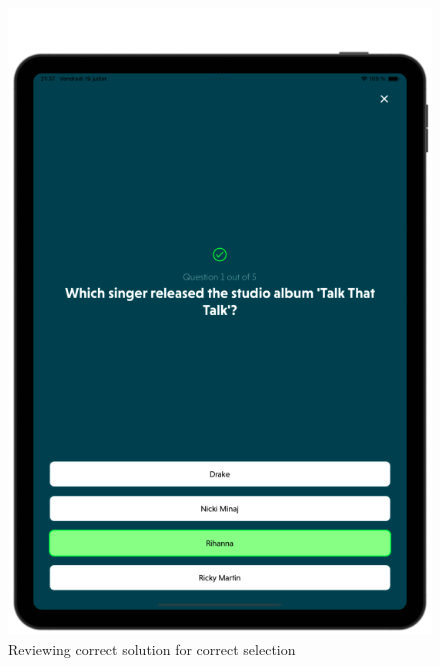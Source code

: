 \begin{figure}[H]
    \centering
    \begin{minipage}[b]{0.43\linewidth}
        \centering
        \includegraphics[width=\linewidth]{TabletUI/Reviewing correct solution for correct solution.png}
        \caption{Reviewing correct solution for correct selection}
    \end{minipage}
    \hspace{0.1\linewidth}
    \begin{minipage}[b]{0.43\linewidth}
        \centering

\end{minipage}
\end{figure}
